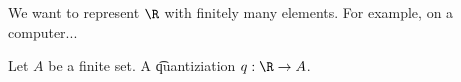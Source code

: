 

We want to represent $\R$ with finitely many elements. For example, on a computer...


Let $A$ be a finite set.
A \t{quantiziation} $q: \R \to A$.

\blankpage
